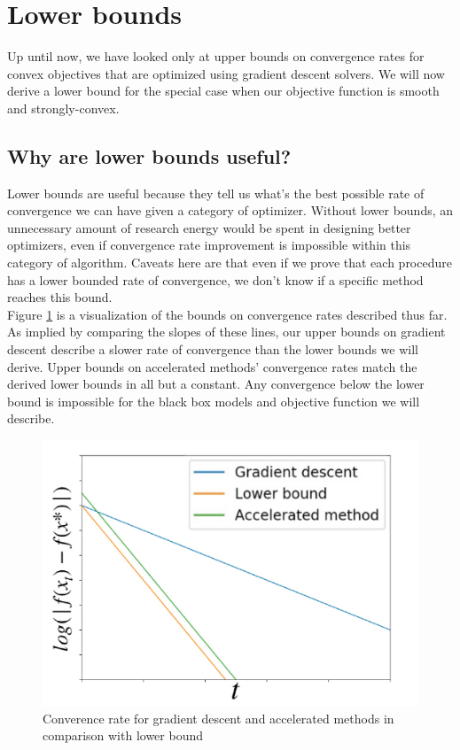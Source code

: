 \documentclass{article}
\begin{document}
\section{Lower bounds}

Up until now, we have looked only at upper bounds on convergence rates for convex objectives that are optimized using gradient descent solvers. We will now derive a lower bound for the special case when our objective function is smooth and strongly-convex.

\subsection{Why are lower bounds useful?}

Lower bounds are useful because they tell us what's the best possible rate of convergence we can have given a category of optimizer. Without lower bounds, an unnecessary amount of research energy would be spent in designing better optimizers, even if convergence rate improvement is impossible within this category of algorithm. Caveats here are that even if we prove that each procedure has a lower bounded rate of convergence, we don't know if a specific method reaches this bound. \\

Figure \ref{conv} is a visualization of the bounds on convergence rates described thus far. As implied by comparing the slopes of these lines, our upper bounds on gradient descent describe a slower rate of convergence than the lower bounds we will derive. Upper bounds on accelerated methods' convergence rates match the derived lower bounds in all but a constant. Any convergence below the lower bound is impossible for the black box models and objective function we will describe.

\begin{figure}[h]
    \centering
    \includegraphics[scale=0.3]{img/gap.pdf}
    \caption{Converence rate for gradient descent and accelerated methods in comparison with lower bound}
    \label{conv}
\end{figure}
\end{document}
